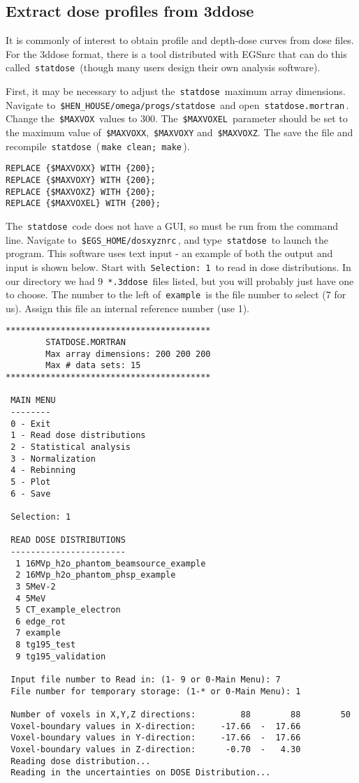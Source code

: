 \documentclass[12pt,twoside]{article}
\begin{document}
\clearpage
\subsection{Extract dose profiles from 3ddose}
It is commonly of interest to obtain profile and depth-dose curves from dose files. For the 3ddose format, there is a tool distributed with EGSnrc that can do this called \,\Verb|statdose|\, (though many users design their own analysis software).

First, it may be necessary to adjust the \,\Verb|statdose|\, maximum array dimensions. Navigate to \,\Verb|$HEN_HOUSE/omega/progs/statdose|\, and open \,\Verb|statdose.mortran|\,. Change the \,\Verb|$MAXVOX|\, values to 300. The \,\Verb|$MAXVOXEL|\, parameter should be set to the maximum value of \,\Verb|$MAXVOXX|, \,\Verb|$MAXVOXY| and \,\Verb|$MAXVOXZ|. The save the file and recompile \,\Verb|statdose|\, (\,\Verb|make clean; make|\,).

{\scriptsize
\begin{lstlisting}[language={},backgroundcolor=\color{white}]
REPLACE {$MAXVOXX} WITH {200};
REPLACE {$MAXVOXY} WITH {200};
REPLACE {$MAXVOXZ} WITH {200};
REPLACE {$MAXVOXEL} WITH {200};
\end{lstlisting}
}

The \,\Verb|statdose|\, code does not have a GUI, so must be run from the command line. Navigate to \,\Verb|$EGS_HOME/dosxyznrc|\,, and type \,\Verb|statdose|\, to launch the program. This software uses text input - an example of both the output and input is shown below. Start with \,\Verb|Selection: 1|\, to read in dose distributions. In our directory we had 9 \,\Verb|*.3ddose|\, files listed, but you will probably just have one to choose. The number to the left of \,\Verb|example|\, is the file number to select (7 for us). Assign this file an internal reference number (use 1).

{\scriptsize
\begin{lstlisting}[language={},backgroundcolor=\color{white}]
*****************************************
        STATDOSE.MORTRAN
        Max array dimensions: 200 200 200
        Max # data sets: 15
*****************************************

 MAIN MENU
 --------
 0 - Exit
 1 - Read dose distributions
 2 - Statistical analysis
 3 - Normalization
 4 - Rebinning
 5 - Plot
 6 - Save

 Selection: 1

 READ DOSE DISTRIBUTIONS
 -----------------------
  1 16MVp_h2o_phantom_beamsource_example
  2 16MVp_h2o_phantom_phsp_example
  3 5MeV-2
  4 5MeV
  5 CT_example_electron
  6 edge_rot
  7 example
  8 tg195_test
  9 tg195_validation

 Input file number to Read in: (1- 9 or 0-Main Menu): 7
 File number for temporary storage: (1-* or 0-Main Menu): 1

 Number of voxels in X,Y,Z directions:         88        88        50
 Voxel-boundary values in X-direction:     -17.66  -  17.66
 Voxel-boundary values in Y-direction:     -17.66  -  17.66
 Voxel-boundary values in Z-direction:      -0.70  -   4.30
 Reading dose distribution...
 Reading in the uncertainties on DOSE Distribution...
\end{lstlisting}
}
\end{document}
